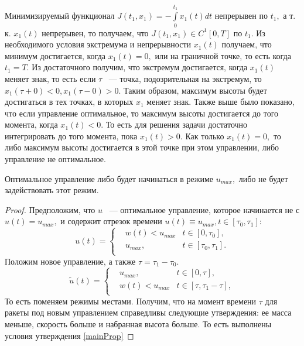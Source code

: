\documentclass[10pt,pdf,hyperref={unicode}]{beamer}
\begin{document}
	Минимизируемый функционал $J(t_1, x_1) = -\int \limits_0^{t_1} x_1(t)dt$ непрерывен по $t_1, $ а т. к. 
	$x_1(t)$ непрерывен, то получаем, что $J(t_1, x_1) \in C^1[0, T]$ по $t_1.$
	Из необходимого условия экстремума и непрерывности $x_1(t)$ получаем, 
	что минимум достигается, когда $x_1(t) = 0,$ или на граничной точке, то есть когда $t_1 = T.$
	Из достаточного получим, что экстремум достигается, когда $x_1(t)$ меняет знак, то есть
	если $\tau$ ~--- точка, подозрительная на экстремум, то $x_1(\tau + 0) < 0, x_1(\tau - 0) > 0.$
	Таким образом, максимум высоты будет достигаться в тех точках, в которых $x_1$ меняет знак.
	Также выше было показано, что если управление оптимальное, то максимум высоты достигается до того момента, когда
	$x_1(t) < 0.$ То есть для решения задачи достаточно интегрировать до того момента, пока $x_1(t) > 0.$
	Как только $x_1(t) = 0,$ то либо максимум высоты достигается в этой точке при этом управлении, либо управление не оптимальное.

	\begin{propos}
		Оптимальное управление либо будет начинаться в режиме $u_{max},$ либо не будет задействовать этот режим.
	   \end{propos}
	   \begin{proof}
		Предположим, что $u$ ~--- оптимальное управление, которое начинается не с $u(t) = u_{max},$
		и содержит отрезок времени $u(t) \equiv u_{max}, t \in[\tau_0, \tau_1]:$
		\[
		 u(t) = 
		 \left\{
		  \begin{aligned}
		   & w(t) < u_{max} & t \in [0, \tau_0],\\
		   & u_{max}, & t \in [\tau_0, \tau_1].\\
		  \end{aligned}
		 \right.
		\]
		Положим новое управление, а также $\tau = \tau_1 - \tau_0.$
		\[
		 \tilde u(t) = 
		 \left\{
		  \begin{aligned}
		   & u_{max}, & t \in [0, \tau],\\
		   & w(t) < u_{max} & t \in [\tau, \tau_1 - \tau],\\
		  \end{aligned}
		 \right.
		\]
		То есть поменяем режимы местами. Получим, что на момент времени $\tau$
		для ракеты под новым управлением справедливы следующие утверждения: ее масса меньше, скорость больше и набранная высота больше.
		То есть выполнены условия утверждения \eqref{mainProp} 
	   \end{proof}
\end{document}
